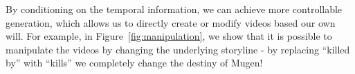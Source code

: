  By conditioning on the temporal information, we can achieve more controllable generation, which allows us to directly create or modify videos based our own will. 
For example, in Figure~\ref{fig:manipulation}, we show that it is possible to manipulate the videos by changing the underlying storyline - by replacing ``killed by'' with ``kills'' we completely change the destiny of Mugen!







